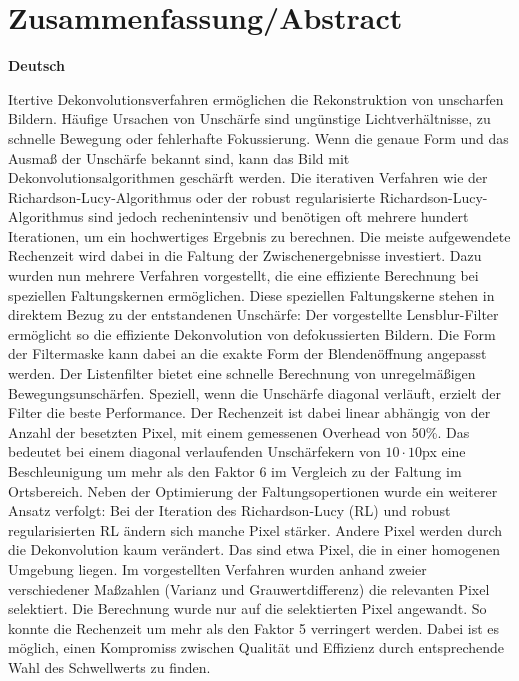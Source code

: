 \documentclass[a4paper,12pt]{article}
\begin{document}

\newpage
 
\section{Zusammenfassung/Abstract}
\textbf{Deutsch}

Itertive Dekonvolutionsverfahren ermöglichen die Rekonstruktion von
unscharfen Bildern. Häufige Ursachen von Unschärfe sind ungünstige
Lichtverhältnisse, zu schnelle Bewegung oder fehlerhafte Fokussierung. 
Wenn die genaue Form und das Ausmaß der Unschärfe
bekannt sind, kann das Bild mit Dekonvolutionsalgorithmen geschärft werden.
Die iterativen Verfahren wie der Richardson-Lucy-Algorithmus oder der robust
regularisierte Richardson-Lucy-Algorithmus sind jedoch rechenintensiv und
benötigen oft mehrere hundert Iterationen, um ein hochwertiges Ergebnis zu
berechnen. Die meiste aufgewendete Rechenzeit wird dabei in die Faltung der
Zwischenergebnisse investiert. Dazu wurden nun mehrere Verfahren vorgestellt,
die eine effiziente Berechnung bei speziellen Faltungskernen ermöglichen. Diese
speziellen Faltungskerne stehen in direktem Bezug zu der entstandenen Unschärfe:
Der vorgestellte Lensblur-Filter ermöglicht so die effiziente Dekonvolution von
defokussierten Bildern. Die Form der Filtermaske kann dabei an die exakte Form
der Blendenöffnung angepasst werden. Der Listenfilter bietet eine schnelle
Berechnung von unregelmäßigen Bewegungsunschärfen. Speziell, wenn die Unschärfe
diagonal verläuft, erzielt der Filter die beste Performance. Der Rechenzeit ist
dabei linear abhängig von der Anzahl der besetzten Pixel, mit einem gemessenen
Overhead von 50\%. Das bedeutet bei einem diagonal verlaufenden Unschärfekern
von $10 \cdot 10$px eine Beschleunigung um mehr als den Faktor 6 im Vergleich
zu der Faltung im Ortsbereich.
Neben der Optimierung der Faltungsopertionen wurde ein weiterer Ansatz verfolgt:
Bei der Iteration des Richardson-Lucy (RL) und robust regularisierten RL ändern
sich manche Pixel stärker. Andere Pixel werden durch die Dekonvolution kaum
verändert. Das sind etwa Pixel, die in einer homogenen Umgebung liegen. Im
vorgestellten Verfahren wurden anhand zweier verschiedener Maßzahlen 
(Varianz und Grauwertdifferenz) die relevanten Pixel selektiert. Die
Berechnung wurde nur auf die selektierten Pixel angewandt. So konnte die
Rechenzeit um mehr als den Faktor 5 verringert werden. Dabei ist es möglich,
einen Kompromiss zwischen Qualität und Effizienz durch entsprechende Wahl des
Schwellwerts zu finden.
\\
\end{document}

